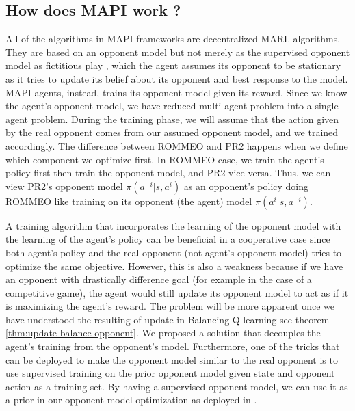 \label{sec:chap3-intro-MAPI}

\subsection{How does MAPI work ?}
All of the algorithms in MAPI frameworks are decentralized MARL algorithms. They are based on an opponent model but not merely as the supervised opponent model as fictitious play \cite{berger2007brown}, which the agent assumes its opponent to be stationary as it tries to update its belief about its opponent and best response to the model. MAPI agents, instead, trains its opponent model given its reward. Since we know the agent's opponent model, we have reduced multi-agent problem into a single-agent problem. During the training phase, we will assume that the action given by the real opponent comes from our assumed opponent model, and we trained accordingly. The difference between ROMMEO \cite{tian2019regularized} and PR2 \cite{wen2019probabilistic} happens when we define which component we optimize first. In ROMMEO case, we train the agent's policy first then train the opponent model, and PR2 vice versa. Thus, we can view PR2's opponent model $\pi(a^{-i} | s, a^i)$ as an opponent's policy doing ROMMEO like training on its opponent (the agent) model $\pi(a^i | s, a^{-i})$. 

A training algorithm that incorporates the learning of the opponent model with the learning of the agent's policy can be beneficial in a cooperative case since both agent's policy and the real opponent (not agent's opponent model) tries to optimize the same objective. However, this is also a weakness because if we have an opponent with drastically difference goal (for example in the case of a competitive game), the agent would still update its opponent model to act as if it is maximizing the agent's reward. The problem will be more apparent once we have understood the resulting of update in Balancing Q-learning see theorem \ref{thm:update-balance-opponent}. We proposed a solution that decouples the agent's training from the opponent's model. Furthermore, one of the tricks that can be deployed to make the opponent model similar to the real opponent is to use supervised training on the prior opponent model given state and opponent action as a training set. By having a supervised opponent model, we can use it as a prior in our opponent model optimization as deployed in \cite{tian2019regularized}.

